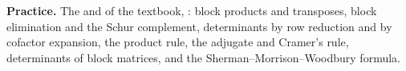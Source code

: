 \documentclass[12pt]{article}
\theoremstyle{definition}
\begin{document}
\bigskip
\textbf{Practice.} The  and  of the textbook, : block products and transposes, block
elimination and the Schur complement, determinants by row reduction and by cofactor expansion, the product rule, the
adjugate and Cramer's rule, determinants of block matrices, and the Sherman--Morrison--Woodbury formula.
\end{document}
